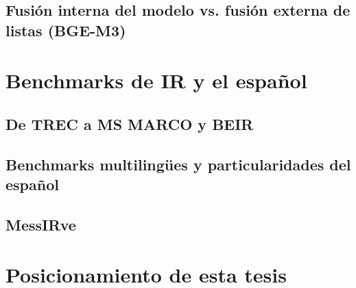 \subsection{Fusión interna del modelo vs. fusión externa de listas (BGE-M3)}\label{subsec:edoarte-fusion-interna}

\section{Benchmarks de IR y el español}\label{sec:edoarte-benchmarks}

\subsection{De TREC a MS MARCO y BEIR}\label{subsec:edoarte-trec-marco-beir}

\subsection{Benchmarks multilingües y particularidades del español}\label{subsec:edoarte-espanol}

\subsection{MessIRve}\label{subsec:edoarte-messirve}

\section{Posicionamiento de esta tesis}\label{sec:edoarte-posicionamiento}
